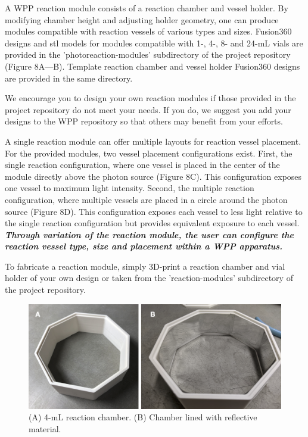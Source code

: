 \documentclass[11pt]{article}
\begin{document}
A WPP reaction module consists of a reaction chamber and vessel holder.
By modifying chamber height and adjusting holder geometry, one can produce modules compatible with reaction vessels of various types and sizes.
Fusion360 designs and stl models for modules compatible with 1-, 4-, 8- and 24-mL vials are provided in the 'photoreaction-modules' subdirectory of the project repository (Figure 8A—B).
Template reaction chamber and vessel holder Fusion360 designs are provided in the same directory.

We encourage you to design your own reaction modules if those provided in the project repository do not meet your needs.
If you do, we suggest you add your designs to the WPP repository so that others may benefit from your efforts.

A single reaction module can offer multiple layouts for reaction vessel placement.
For the provided modules, two vessel placement configurations exist.
First, the single reaction configuration, where one vessel is placed in the center of the module directly above the photon source (Figure 8C).
This configuration exposes one vessel to maximum light intensity.
Second, the multiple reaction configuration, where multiple vessels are placed in a circle around the photon source (Figure 8D).
This configuration exposes each vessel to less light relative to the single reaction configuration but provides equivalent exposure to each vessel.
\textbf{\textit{Through variation of the reaction module, the user can configure the reaction vessel type, size and placement within a WPP apparatus.}}

To fabricate a reaction module, simply 3D-print a reaction chamber and vial holder of your own design or taken from the 'reaction-modules' subdirectory of the project repository.

\begin{figure}[H]
	\centering
	\includegraphics[width=\textwidth]{"./fig9.png"}
	\caption{(A) 4-mL reaction chamber. (B) Chamber lined with reflective material.}
\end{figure}
\end{document}

